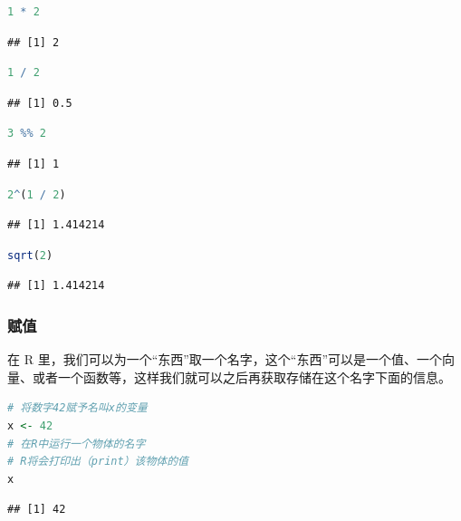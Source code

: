 \documentclass[]{ctexbook}
\begin{document}
\begin{lstlisting}[language=R]
1 * 2
\end{lstlisting}

\begin{lstlisting}
## [1] 2
\end{lstlisting}

\begin{lstlisting}[language=R]
1 / 2
\end{lstlisting}

\begin{lstlisting}
## [1] 0.5
\end{lstlisting}

\begin{lstlisting}[language=R]
3 %% 2
\end{lstlisting}

\begin{lstlisting}
## [1] 1
\end{lstlisting}

\begin{lstlisting}[language=R]
2^(1 / 2)
\end{lstlisting}

\begin{lstlisting}
## [1] 1.414214
\end{lstlisting}

\begin{lstlisting}[language=R]
sqrt(2)
\end{lstlisting}

\begin{lstlisting}
## [1] 1.414214
\end{lstlisting}

\hypertarget{ux8d4bux503c}{%
\subsubsection{赋值}\label{ux8d4bux503c}}

在 R 里，我们可以为一个``东西''取一个名字，这个``东西''可以是一个值、一个向量、或者一个函数等，这样我们就可以之后再获取存储在这个名字下面的信息。

\begin{lstlisting}[language=R]
# 将数字42赋予名叫x的变量
x <- 42
# 在R中运行一个物体的名字
# R将会打印出（print）该物体的值
x
\end{lstlisting}

\begin{lstlisting}
## [1] 42
\end{lstlisting}
\end{document}
